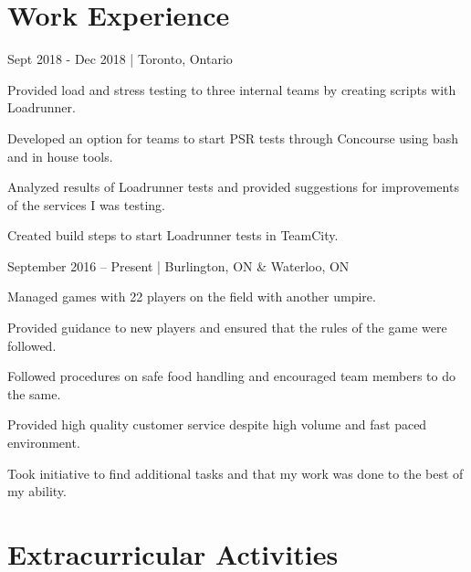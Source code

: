\documentclass[]{formatting}
\begin{document}
\section{Work  Experience}

 { Sept 2018 - Dec 2018 | Toronto, Ontario}
\begin{tightemize}
\item Provided load and stress testing to three internal teams by creating scripts with Loadrunner. 
\item Developed an option for teams to start PSR tests through Concourse using bash and in house tools. 
\item Analyzed results of Loadrunner tests and provided suggestions for improvements of the services I was testing. 
\item Created build steps to start Loadrunner tests in TeamCity. 
\end{tightemize}
\sectionsep

 {September 2016 – Present | Burlington, ON  \& Waterloo, ON}
\begin{tightemize}
\item Managed games with 22 players on the field with another umpire. 
\item Provided guidance to new players and ensured that the rules of the game were followed. 
\end{tightemize}
\sectionsep

\begin{tightemize}
\item Followed procedures on safe food handling and encouraged team members to do the same. 
\item Provided high quality customer service despite high volume and fast paced environment. 
\item Took initiative to find additional tasks and that my work was done to the best of my ability. 
\end{tightemize}
\sectionsep



\section{Extracurricular  Activities}
\end{document}
